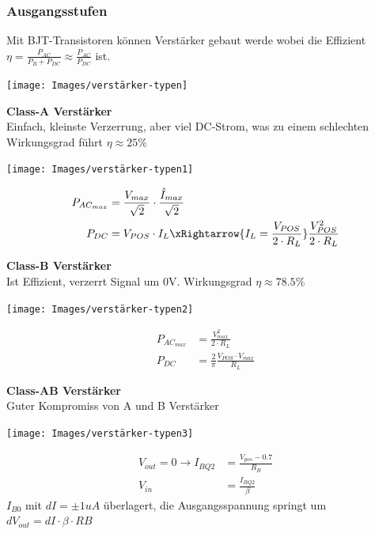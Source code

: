 \subsubsection{Ausgangsstufen}
Mit BJT-Transistoren können Verstärker gebaut werde wobei die Effizient $\eta = \frac{P_{AC}}{P_B + P_{DC}} \approx \frac{P_{AC}}{P_{DC}}$ ist.
\begin{center}
	\texttt{[image: Images/verstärker-typen]}
\end{center}

\textbf{Class-A Verstärker}\\
Einfach, kleinste Verzerrung, aber viel DC-Strom, was zu einem schlechten Wirkungsgrad führt $\eta \approx 25\%$ \\
\begin{minipage}{0.20\textwidth}
	\texttt{[image: Images/verstärker-typen1]}
\end{minipage}%
\begin{minipage}{0.30\textwidth}
	\begin{align*}
		P_{AC_{max}} &= \frac{V_{max}}{\sqrt{2}}\cdot \frac{\hat{I}_{max}}{\sqrt{2}} \\
		P_{DC} &= V_{POS} \cdot I_L \xRightarrow{I_L = \frac{V_{POS}}{2\cdot R_L}} \frac{V_{POS}^2}{2\cdot R_L}
	\end{align*}
\end{minipage}

\textbf{Class-B Verstärker}\\
Ist Effizient, verzerrt Signal um 0V. Wirkungsgrad $\eta \approx 78.5\%$\\
\begin{minipage}{0.20\textwidth}
	\texttt{[image: Images/verstärker-typen2]}
\end{minipage}%
\begin{minipage}{0.30\textwidth}
	\begin{align*}
		P_{AC_{max}} &= \frac{V_{max}^2}{2 \cdot R_L} \\
		P_{DC} &= \frac{2}{\pi}\frac{V_{POS}\cdot V_{max}}{R_L}
	\end{align*}
\end{minipage}

\textbf{Class-AB Verstärker}\\
Guter Kompromiss von A und B Verstärker\\
\begin{minipage}{0.20\textwidth}
	\texttt{[image: Images/verstärker-typen3]}
\end{minipage}%
\begin{minipage}{0.30\textwidth}
	\begin{align*}
		V_{out} = 0 \rightarrow I_{BQ2} &= \frac{V_{pos} - 0.7}{R_B}\\
		V_{in} &= \frac{I_{BQ2}}{\beta}
	\end{align*}
	$I_{B0}$ mit $dI = \pm1uA$ überlagert, die Ausgangsspannung springt um $dV_{out} = dI \cdot \beta \cdot RB$
\end{minipage}

